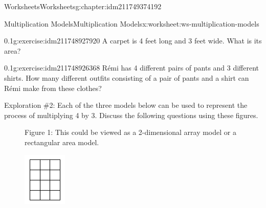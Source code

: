 \documentclass[twoside,11pt,]{book}
\begin{document}
\begin{chapterptx}{Worksheets}{}{Worksheets}{}{}{g:chapter:idm211749374192}
\begin{worksheet-section-numberless}{Multiplication Models}{}{Multiplication Models}{}{}{x:worksheet:ws-multiplication-models}
\begin{divisionexercise}{3}{}{0.1}{g:exercise:idm211748927920}
A carpet is 4 feet long and 3 feet wide. What is its area?%
\end{divisionexercise}%
\begin{divisionexercise}{4}{}{0.1}{g:exercise:idm211748926368}%
Rémi has 4 different pairs of pants and 3 different shirts. How many different outfits consisting of a pair of pants and a shirt can Rémi make from these clothes?%
\end{divisionexercise}%
\clearpage
\begin{introduction}{}%
Exploration \#2: Each of the three models below can be used to represent the process of multiplying 4 by 3.  Discuss the following questions using these figures.%
%
\begin{description}
\item[{}]Figure 1: This could be viewed as a 2-dimensional array model or a rectangular area model. \begin{sidebyside}{1}{0.45}{0.45}{0}%
\begin{sbspanel}{0.1}%
\includegraphics[width=1\linewidth]{images/mult-array.png}
\end{sbspanel}%

\end{sidebyside}
\end{description}
\end{introduction}
\end{worksheet-section-numberless}
\end{chapterptx}
\end{document}
